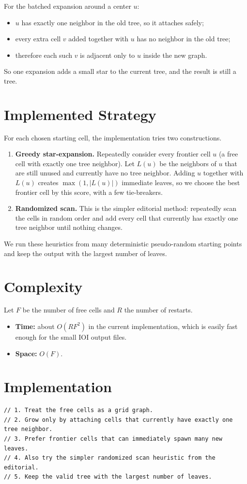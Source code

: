 \documentclass[11pt,a4paper]{article}
\begin{document}
For the batched expansion around a center $u$:
\begin{itemize}
  \item $u$ has exactly one neighbor in the old tree, so it attaches safely;
  \item every extra cell $v$ added together with $u$ has no neighbor in the old tree;
  \item therefore each such $v$ is adjacent only to $u$ inside the new graph.
\end{itemize}

So one expansion adds a small star to the current tree, and the result is still a tree.

\section{Implemented Strategy}
For each chosen starting cell, the implementation tries two constructions.

\begin{enumerate}
  \item \textbf{Greedy star-expansion.}
        Repeatedly consider every frontier cell $u$ (a free cell with exactly one tree neighbor).
        Let $L(u)$ be the neighbors of $u$ that are still unused and currently have no tree neighbor.
        Adding $u$ together with $L(u)$ creates $\max(1, |L(u)|)$ immediate leaves, so we choose the
        best frontier cell by this score, with a few tie-breakers.

  \item \textbf{Randomized scan.}
        This is the simpler editorial method: repeatedly scan the cells in random order and add every
        cell that currently has exactly one tree neighbor until nothing changes.
\end{enumerate}

We run these heuristics from many deterministic pseudo-random starting points and keep the output with
the largest number of leaves.

\section{Complexity}
Let $F$ be the number of free cells and $R$ the number of restarts.

\begin{itemize}
  \item \textbf{Time:} about $O(RF^2)$ in the current implementation, which is easily fast enough for
        the small IOI output files.
  \item \textbf{Space:} $O(F)$.
\end{itemize}

\section{Implementation}
\begin{lstlisting}
// 1. Treat the free cells as a grid graph.
// 2. Grow only by attaching cells that currently have exactly one tree neighbor.
// 3. Prefer frontier cells that can immediately spawn many new leaves.
// 4. Also try the simpler randomized scan heuristic from the editorial.
// 5. Keep the valid tree with the largest number of leaves.
\end{lstlisting}
\end{document}
